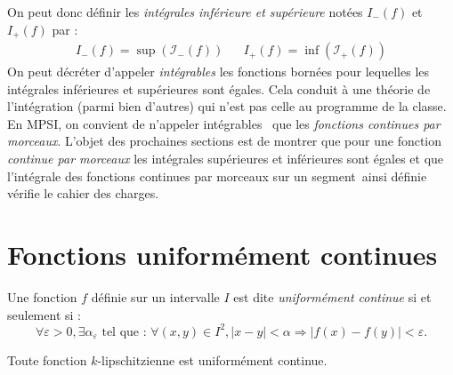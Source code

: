 On peut donc définir les \emph{intégrales inférieure et supérieure} notées $I_-(f)$ et $I_+(f)$ par :
\begin{align*}
 I_-(f) = \sup( \mathcal I_-(f))   & & I_+(f) = \inf(  \mathcal I_+(f) )
\end{align*}
On peut décréter d'appeler \emph{intégrables} les fonctions bornées pour lequelles les intégrales inférieures et supérieures sont égales. Cela conduit à une théorie de l'intégration (parmi bien d'autres) qui n'est pas celle au programme de la classe.\newline
En MPSI, on convient de n'appeler \og intégrables\fg~ que les \emph{fonctions continues par morceaux}. L'objet des prochaines sections est de montrer que pour une fonction \emph{continue par morceaux} les intégrales supérieures et inférieures sont égales et que \og l'intégrale des fonctions continues par morceaux sur un segment\fg~ainsi définie vérifie le cahier des charges.

\section{Fonctions uniformément continues}
\begin{defi}
 Une fonction $f$ définie sur un intervalle $I$ est dite \emph{uniformément continue} si et seulement si :
\begin{displaymath}
 \forall \varepsilon>0, \exists \alpha_\varepsilon \text{ tel que : }\forall (x,y)\in I^2, |x-y|<\alpha \Rightarrow |f(x)-f(y)|<\varepsilon.
\end{displaymath}
\end{defi}
\begin{rem}
 Toute fonction $k$-lipschitzienne est uniformément continue.
\end{rem}

